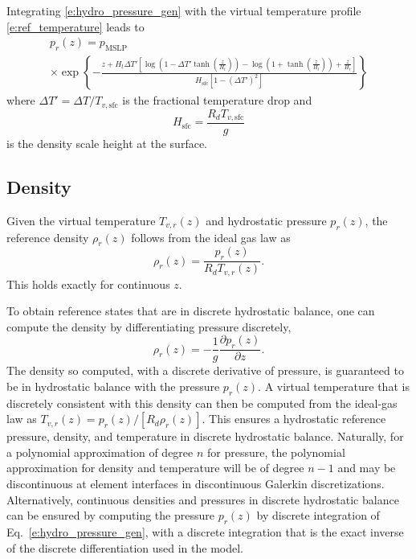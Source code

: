 \documentclass{report}
\begin{document}
Integrating \eqref{e:hydro_pressure_gen} with the virtual temperature profile \eqref{e:ref_temperature} leads to
\begin{multline}\label{e:hydro_pressure}
p_r(z) = p_{\mathrm{MSLP}}\\
 \times \exp\left\{
 -\frac{z + H_{t} \Delta T' \left[
 \log \left(1-\Delta T' \tanh\left(\frac{z}{H_{t}}\right)\right) -
 \log\left(1 + \tanh\left(\frac{z}{H_{t}}\right)\right) + \frac{z}{H_t}\right]}%
 {H_{\mathrm{sfc}}[1 - (\Delta T')^2]}
\right\}
\end{multline}
where $\Delta T' = \Delta T/T_{v, \mathrm{sfc}}$ is the fractional temperature drop and \begin{equation}
H_\mathrm{sfc}  = \frac{R_d T_{v,\mathrm{sfc}}}{g}
\end{equation}
is the density scale height at the surface. 

\subsection{Density}
 
Given the virtual temperature $T_{v,r}(z)$ and hydrostatic pressure $p_r(z)$, the reference density $\rho_r(z)$ follows from the ideal gas law as
\begin{equation}\label{e:hydro_density}
    \rho_r(z) = \frac{p_r(z)}{R_d T_{v,r}(z)}.
\end{equation}
This holds exactly for continuous $z$.

To obtain reference states that are in discrete hydrostatic balance, one can compute the density by differentiating pressure discretely,
\begin{equation}\label{e:hydro_density_discrete}
    \rho_r(z) = -\frac{1}{g} \frac{\partial p_r(z)}{\partial z}.
\end{equation}
The density so computed, with a discrete derivative of pressure, is guaranteed to be in hydrostatic balance with the pressure $p_r(z)$. A virtual temperature that is discretely consistent with this density can then be computed from the ideal-gas law as $T_{v,r}(z) = p_r(z)/[R_d \rho_r(z)]$. This ensures a hydrostatic reference pressure, density, and temperature in discrete hydrostatic balance. Naturally, for a polynomial approximation of degree $n$ for pressure, the polynomial approximation for density and temperature will be of degree $n-1$ and may be discontinuous at element interfaces in discontinuous Galerkin discretizations. Alternatively, continuous densities and pressures in discrete hydrostatic balance can be ensured by computing the pressure $p_r(z)$ by discrete integration of Eq.~\eqref{e:hydro_pressure_gen}, with a discrete integration that is the exact inverse of the discrete differentiation used in the model.
\end{document}
